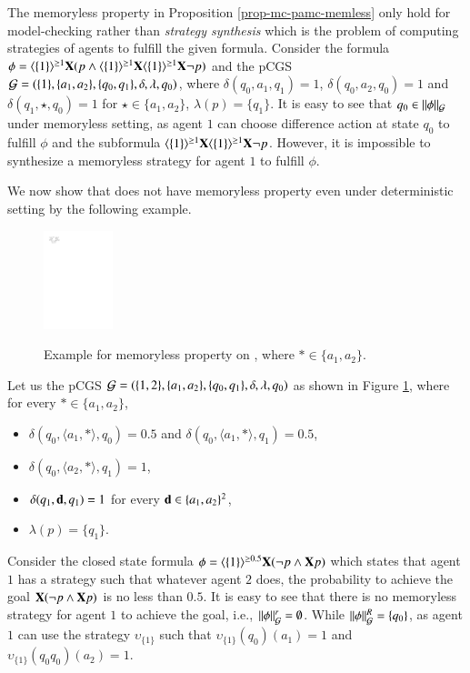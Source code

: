 \begin{remark}
The memoryless property in Proposition \ref{prop-mc-pamc-memless} only hold for model-checking rather than \emph{strategy synthesis} which is the problem of computing strategies of agents to fulfill the given formula. Consider the \pamcc formula $\phi=\langle{\{1\}}\rangle^{\geq 1}{\bf X} (p\wedge \langle{\{1\}}\rangle^{\geq 1}{\bf X} \langle{\{1\}}\rangle^{\geq 1}{\bf X}\neg p)$ and the pCGS $\mathcal{G}=(\{1\},\{a_1,a_2\},\{q_0,q_1\}, \delta,\lambda, q_0)$,
where $\delta(q_0,a_1,q_1)=1$, $\delta(q_0,a_2,q_0)=1$ and $\delta(q_1,\star,q_0)=1$ for $\star\in\{a_1,a_2\}$, $\lambda(p)=\{q_1\}$.
It is easy to see that $q_0\in\|\phi\|_{\mathcal{G}}$ under memoryless setting, as
agent $1$ can choose difference action at state $q_0$ to fulfill $\phi$ and the subformula $\langle{\{1\}}\rangle^{\geq 1}{\bf X}\langle{\{1\}}\rangle^{\geq 1}{\bf X}\neg p$.
However, it is impossible to synthesize a memoryless strategy for agent $1$ to fulfill $\phi$.
\end{remark}

We now show that \pamc does not have memoryless property even under deterministic setting by the following example.


\begin{figure}[h]
  \centering
  \includegraphics[width=0.18\textwidth]{figure//fig-example1}\\
  \caption{Example for memoryless property on \pamc, where $*\in\{a_1,a_2\}$.}\label{fig-example1}
\end{figure}

\begin{example}
Let us the pCGS $\mathcal{G}=(\{1,2\},\{a_1,a_2\},\{q_0,q_1\}, \delta,\lambda, q_0)$ as shown in Figure \ref{fig-example1}, where for every $*\in\{a_1,a_2\}$,
\begin{itemize}
\item $\delta(q_0,\langle a_1,*\rangle, q_0)=0.5$ and $\delta(q_0,\langle a_1,*\rangle, q_1)=0.5$,
\item $\delta(q_0,\langle a_2,*\rangle, q_1)=1$,
\item $\delta(q_1,{\bf d},q_1)=1$ for every ${\bf d}\in \{a_1,a_2\}^2$,
\item $\lambda(p)=\{q_1\}$.
\end{itemize}

Consider the closed \pamc state formula $\phi=\langle{\{1\}}\rangle^{\geq 0.5}{\bf X}(\neg p \wedge {\bf X} p)$ which states that
agent $1$ has a strategy such that whatever agent $2$ does, the probability to achieve the goal ${\bf X}(\neg p \wedge {\bf X} p)$
is no less than $0.5$. It is easy to see that there is no memoryless strategy for agent $1$ to achieve the goal, i.e.,
$\|{\phi}\|_{\mathcal{G}}^r=\emptyset$. While $\|{\phi}\|_{\mathcal{G}}^R=\{q_0\}$, as agent $1$ can use the strategy $\upsilon_{\{1\}}$
such that $\upsilon_{\{1\}}(q_0)(a_1)=1$ and $\upsilon_{\{1\}}(q_0q_0)(a_2)=1$.
\end{example}

